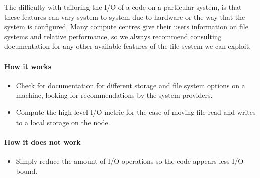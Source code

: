 The difficulty with tailoring the I/O of a code on a particular system, is that
these features can vary system to system due to hardware or the way that the
system is configured. Many compute centres give their users information on file
systems and relative performance, so we always recommend consulting
documentation for any other available features of the file system we can
exploit.

\paragraph*{How it works}

\begin{itemize}[noitemsep]
  \item[$\boxplus$] Check for documentation for different storage and file system options on a machine, looking for recommendations by the system providers.
  \item[$\boxplus$] Compute the high-level I/O metric for the case of moving file read and writes to a local storage on the node.
\end{itemize}


\paragraph*{How it does not work}

\begin{itemize}[noitemsep]
  \item[$\boxminus$] Simply reduce the amount of I/O operations so the code appears less I/O bound. 
\end{itemize}
